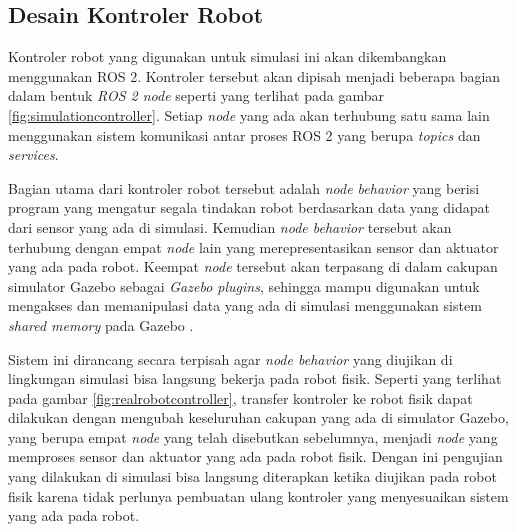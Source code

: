 \subsection{Desain Kontroler Robot}
\label{subsec:controllerdesign}



Kontroler robot yang digunakan untuk simulasi ini akan dikembangkan menggunakan ROS 2.
Kontroler tersebut akan dipisah menjadi beberapa bagian dalam bentuk \emph{ROS 2 node} seperti yang terlihat pada gambar \ref{fig:simulationcontroller}.
Setiap \emph{node} yang ada akan terhubung satu sama lain menggunakan sistem komunikasi antar proses ROS 2 yang berupa \emph{topics} dan \emph{services}.

Bagian utama dari kontroler robot tersebut adalah \emph{node behavior} yang berisi program yang mengatur segala tindakan robot berdasarkan data yang didapat dari sensor yang ada di simulasi.
Kemudian \emph{node behavior} tersebut akan terhubung dengan empat \emph{node} lain yang merepresentasikan sensor dan aktuator yang ada pada robot.
Keempat \emph{node} tersebut akan terpasang di dalam cakupan simulator Gazebo sebagai \emph{Gazebo plugins},
  sehingga mampu digunakan untuk mengakses dan memanipulasi data yang ada di simulasi menggunakan sistem \emph{shared memory} pada Gazebo \citep{gazeboplugins}.



Sistem ini dirancang secara terpisah agar \emph{node behavior} yang diujikan di lingkungan simulasi bisa langsung bekerja pada robot fisik.
Seperti yang terlihat pada gambar \ref{fig:realrobotcontroller},
  transfer kontroler ke robot fisik dapat dilakukan dengan mengubah keseluruhan cakupan yang ada di simulator Gazebo,
  yang berupa empat \emph{node} yang telah disebutkan sebelumnya,
  menjadi \emph{node} yang memproses sensor dan aktuator yang ada pada robot fisik.
Dengan ini pengujian yang dilakukan di simulasi bisa langsung diterapkan ketika diujikan pada robot fisik karena tidak perlunya pembuatan ulang kontroler yang menyesuaikan sistem yang ada pada robot.
